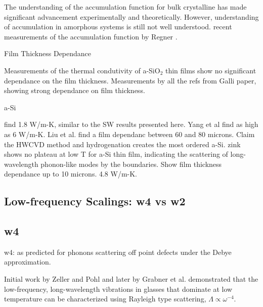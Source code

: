\documentclass[aps,prb,twocolumn,superscriptaddress,footinbib,amsmath,amssymb,floatfix]{revtex4}
\begin{document}
The understanding of the accumulation function for bulk 
crystalline has made significant advancement experimentally
\cite{minnich_thermal_2011}
and 
theoretically.\cite{yang_mean_2013} However, understanding 
of accumulation in amorphous systems is still not 
well understood.
\cite{feldman_thermal_1993,feldman_numerical_1999,he_thermal_2011}
recent measurements of the accumulation function by Regner .
\cite{regner_broadband_2013}

Film Thickness Dependance

Measurements of the thermal condutivity of a-SiO$_2$ thin 
films show no significant dependance on the film thickness. 
\cite{lee_heat_1997,yamane_measurement_2002} 
Measurements by all the refs from Galli paper, showing strong
dependance on film thickness.
\cite{wada_thermal_1996,zink_thermal_2006,yang_anomalously_2010,
cahill_thermal_1994,kuo_thermal_1992,moon_thermal_2002,liu_high_2009}

a-Si

\cite{wada_thermal_1996} find 1.8 W/m-K, similar to the SW results 
presented here.
Yang et al find as high as 6 W/m-K.\cite{yang_anomalously_2010}
Liu et al. find a film dependanc between 60 and 80 microns.
\cite{liu_high_2009} Claim the HWCVD method and hydrogenation 
creates the most ordered a-Si.
zink shows no plateau at low T for a-Si thin film, indicating 
the scattering of long-wavelength phonon-like modes 
by the boundaries.\cite{zink_thermal_2006}
Show film thickness dependance up to 10 microns.
\cite{kuo_thermal_1992}
4.8 W/m-K.\cite{hasselman_thermal_1989}


\subsection{\label{S:Theory:Thermal}Low-frequency Scalings: w4 vs w2}

\subsection{\label{S:Theory:Thermal}w4}

w4: as predicted for phonons scattering off point defects under 
the Debye approximation.

Initial work by Zeller and Pohl\cite{zeller_thermal_1971} 
and later by Grabner et al.\cite{graebner_phonon_1986}  
demonstrated that the low-frequency, long-wavelength 
vibrations in glasses that dominate at low temperature can 
be characterized using Rayleigh 
type scattering, $\Lambda \propto \omega^{-4}$. 
\end{document}
